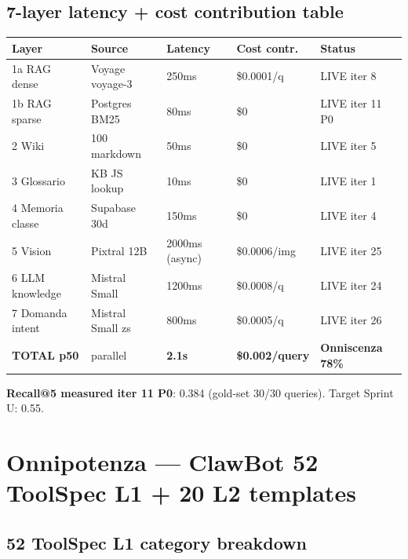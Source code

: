\documentclass[12pt,a4paper]{article}
\begin{document}
\subsection{7-layer latency + cost contribution table}

\begin{center}
\begin{tabular}{l l l l l}
\toprule
\textbf{Layer} & \textbf{Source} & \textbf{Latency} & \textbf{Cost contr.} & \textbf{Status} \\
\midrule
1a RAG dense & Voyage voyage-3 & 250ms & \$0.0001/q & LIVE iter 8 \\
1b RAG sparse & Postgres BM25 & 80ms & \$0 & LIVE iter 11 P0 \\
2 Wiki & 100 markdown & 50ms & \$0 & LIVE iter 5 \\
3 Glossario & KB JS lookup & 10ms & \$0 & LIVE iter 1 \\
4 Memoria classe & Supabase 30d & 150ms & \$0 & LIVE iter 4 \\
5 Vision & Pixtral 12B & 2000ms (async) & \$0.0006/img & LIVE iter 25 \\
6 LLM knowledge & Mistral Small & 1200ms & \$0.0008/q & LIVE iter 24 \\
7 Domanda intent & Mistral Small zs & 800ms & \$0.0005/q & LIVE iter 26 \\
\midrule
\textbf{TOTAL p50} & parallel & \textbf{2.1s} & \textbf{\$0.002/query} & \textbf{Onniscenza 78\%} \\
\bottomrule
\end{tabular}
\end{center}

\textbf{Recall@5 measured iter 11 P0}: 0.384 (gold-set 30/30 queries). Target Sprint U: 0.55.

\newpage

\section{Onnipotenza --- ClawBot 52 ToolSpec L1 + 20 L2 templates}

\subsection{52 ToolSpec L1 category breakdown}
\end{document}
